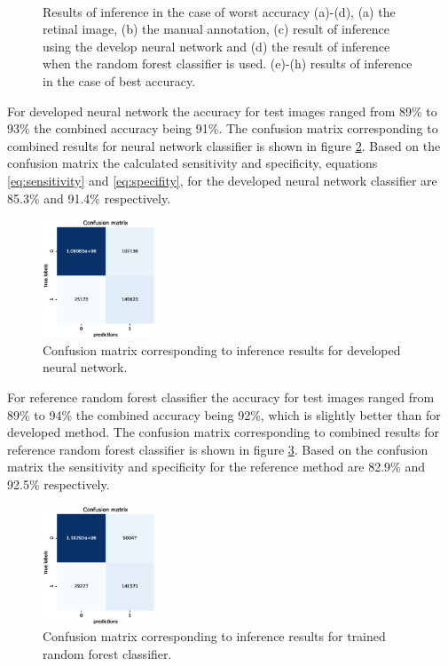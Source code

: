 \documentclass[aps,prb,10pt,twocolumn,groupedaddress]{revtex4-1}
\begin{document}
\begin{figure}[!t]
\begin{subfigure}[]{0.22\textwidth}
		\caption{}
	\end{subfigure}\\
	\caption{Results of inference in the case of worst accuracy (a)-(d), (a) the retinal image, (b) the manual annotation, (c) result of inference using the develop neural network and (d) the result of inference when the random forest classifier is used. (e)-(h) results of inference in the case of best accuracy.}
	\label{fig:result_images}
\end{figure}

For developed neural network the accuracy for test images ranged from 89\% to 93\% the combined accuracy being 91\%. The confusion matrix corresponding to combined results for neural network classifier is shown in figure \ref{fig:confusion_matrix_nn}. Based on the confusion matrix the calculated sensitivity and specificity, equations \ref{eq:sensitivity} and \ref{eq:specifity}, for the developed neural network classifier are 85.3\% and 91.4\% respectively. 
\begin{figure}[!h]
	\centering
	\includegraphics[width=0.3\textwidth]{images/confusion_matrix_nn_total_accuracy_91.eps}
	\caption{Confusion matrix corresponding to inference results for developed neural network.}
	\label{fig:confusion_matrix_nn}
\end{figure}

For reference random forest classifier the accuracy for test images ranged from 89\% to 94\% the combined accuracy being 92\%,  which is slightly better than for developed method. The confusion matrix corresponding to combined results for reference random forest classifier is shown in figure \ref{fig:confusion_matrix_rf}. Based on the confusion matrix the sensitivity and specificity for the reference method are 82.9\% and 92.5\% respectively.
\begin{figure}[!h]
	\centering
	\includegraphics[width=0.3\textwidth]{images/confusion_matrix_rf_total_accuracy_92.eps}
	\caption{Confusion matrix corresponding to inference results for trained random forest classifier.}
	\label{fig:confusion_matrix_rf}
\end{figure}
\end{document}
